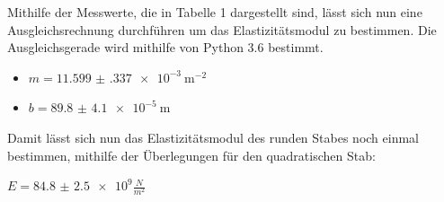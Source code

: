 Mithilfe der Messwerte, die in Tabelle 1 dargestellt sind, lässt sich nun eine
Ausgleichsrechnung durchführen um das Elastizitätsmodul zu bestimmen. Die Ausgleichsgerade
wird mithilfe von Python 3.6 bestimmt.

\begin{itemize}
  \item $m = \SI{11.599(337)e-3}{\meter\tothe{-2}}$
  \item $b = \SI{89.8(41)e-5}{\meter}$
\end{itemize}


Damit lässt sich nun das Elastizitätsmodul des runden Stabes noch einmal bestimmen,
mithilfe der Überlegungen für den quadratischen Stab:

\centerline{$E= \num{84.8(25)e9} \frac{N}{m^2}$}
